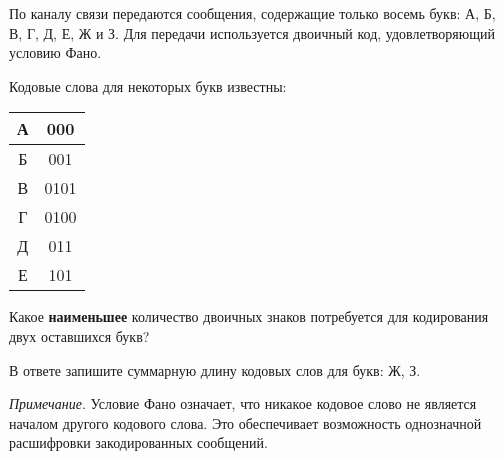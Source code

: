 \documentclass[14pt,a4paper]{article}
\begin{document}
По каналу связи передаются сообщения, содержащие только восемь букв:
А, Б, В, Г, Д, Е, Ж и З. Для передачи используется двоичный код,
удовлетворяющий условию Фано.

Кодовые слова для некоторых букв известны:

\begin{center}
	\begin{tabular}{|c|c|}
		\hline
		А        & 000                    \\ \hline
		Б        & 001                    \\ \hline
		В        & 0101                   \\ \hline
		Г        & 0100                   \\ \hline
		Д        & 011                    \\ \hline
		Е        & 101                    \\ \hline
	\end{tabular}
\end{center}

Какое \textbf{наименьшее} количество двоичных знаков потребуется для
кодирования двух оставшихся букв?

В ответе запишите суммарную длину кодовых слов для букв: Ж, З.

\textit{Примечание}. Условие Фано означает, что никакое кодовое слово
не является началом другого кодового слова. Это обеспечивает
возможность однозначной расшифровки закодированных сообщений.
\end{document}
